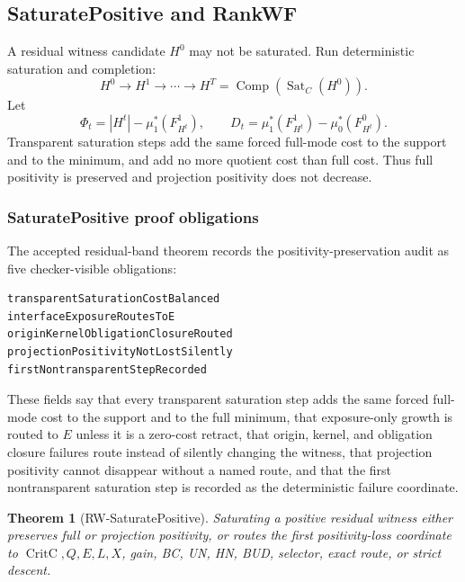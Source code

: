 \documentclass[10.5pt,a4paper]{article}
\newtheorem{theorem}{Theorem}[section]
\newcommand{\Sat}{\operatorname{Sat}}
\newcommand{\Comp}{\operatorname{Comp}}
\newcommand{\CritC}{\operatorname{CritC}}
\begin{document}
\subsection{SaturatePositive and RankWF}
A residual witness candidate \(H^0\) may not be saturated. Run deterministic saturation and completion:
\[
H^0\to H^1\to\cdots\to H^T=\Comp(\Sat_C(H^0)).
\]
Let
\[
\Phi_t=|H^t|-\mu_1^*(F_{H^t}^1),\qquad D_t=\mu_1^*(F_{H^t}^1)-\mu_0^*(F_{H^t}^0).
\]
Transparent saturation steps add the same forced full-mode cost to the support and to the minimum, and add no more quotient cost than full cost. Thus full positivity is preserved and projection positivity does not decrease.

\subsubsection{SaturatePositive proof obligations}
The accepted residual-band theorem records the positivity-preservation audit as five checker-visible obligations:
\begin{lstlisting}
transparentSaturationCostBalanced
interfaceExposureRoutesToE
originKernelObligationClosureRouted
projectionPositivityNotLostSilently
firstNontransparentStepRecorded
\end{lstlisting}
These fields say that every transparent saturation step adds the same forced full-mode cost to the support and to the full minimum, that exposure-only growth is routed to \(E\) unless it is a zero-cost retract, that origin, kernel, and obligation closure failures route instead of silently changing the witness, that projection positivity cannot disappear without a named route, and that the first nontransparent saturation step is recorded as the deterministic failure coordinate.

\begin{theorem}[RW-SaturatePositive]
Saturating a positive residual witness either preserves full or projection positivity, or routes the first positivity-loss coordinate to \(\CritC,Q,E,L,X\), gain, BC, UN, HN, BUD, selector, exact route, or strict descent.
\end{theorem}
\end{document}
